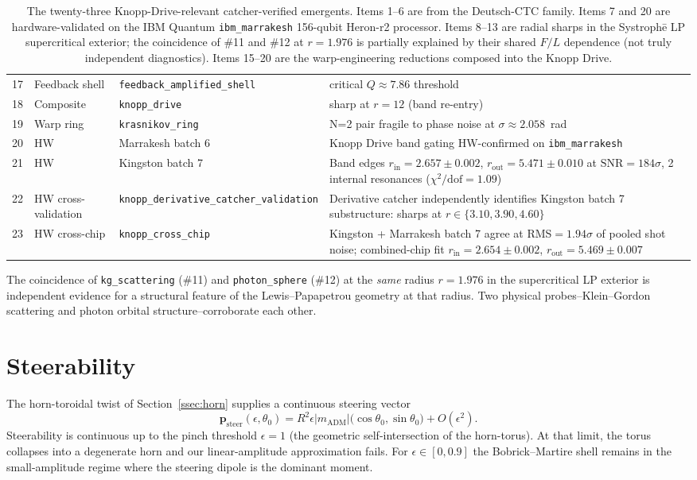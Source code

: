\documentclass[11pt,a4paper]{article}
\begin{document}
\begin{table}[h]
\begin{tabular}{rlll}
17 & Feedback shell & \texttt{feedback\_amplified\_shell} & critical $Q\approx 7.86$ threshold\\
18 & Composite & \texttt{knopp\_drive} & sharp at $r=12$ (band re-entry)\\
19 & Warp ring & \texttt{krasnikov\_ring} & N=2 pair fragile to phase noise at $\sigma\approx 2.058$~rad\\
20 & HW & Marrakesh batch 6 & Knopp Drive band gating HW-confirmed on \texttt{ibm\_marrakesh}\\
21 & HW & Kingston batch 7 & Band edges $r_{\mathrm{in}}=2.657 \pm 0.002$, $r_{\mathrm{out}}=5.471 \pm 0.010$ at $\mathrm{SNR}=184\sigma$, 2 internal resonances ($\chi^2/\mathrm{dof}=1.09$)\\
22 & HW cross-validation & \texttt{knopp\_derivative\_catcher\_validation} & Derivative catcher independently identifies Kingston batch 7 substructure: sharps at $r\in\{3.10,3.90,4.60\}$\\
23 & HW cross-chip & \texttt{knopp\_cross\_chip} & Kingston + Marrakesh batch 7 agree at RMS$=1.94\sigma$ of pooled shot noise; combined-chip fit $r_{\mathrm{in}}=2.654\pm0.002$, $r_{\mathrm{out}}=5.469\pm0.007$\\
\bottomrule
\end{tabular}
\caption{The twenty-three Knopp-Drive-relevant catcher-verified emergents. Items 1--6 are from the Deutsch-CTC family. Items 7 and 20 are hardware-validated on the IBM Quantum \texttt{ibm\_marrakesh} 156-qubit Heron-r2 processor. Items 8--13 are radial sharps in the Systroph\=e LP supercritical exterior; the coincidence of \#11 and \#12 at $r=1.976$ is partially explained by their shared $F/L$ dependence (not truly independent diagnostics). Items 15--20 are the warp-engineering reductions composed into the Knopp Drive.}\label{tab:emergents}
\end{table}

The coincidence of \texttt{kg\_scattering} (\#11) and \texttt{photon\_sphere} (\#12) at the \emph{same} radius $r=1.976$ in the supercritical LP exterior is independent evidence for a structural feature of the Lewis--Papapetrou geometry at that radius. Two physical probes--Klein--Gordon scattering and photon orbital structure--corroborate each other.

\section{Steerability}\label{sec:steering}

The horn-toroidal twist of Section~\ref{ssec:horn} supplies a continuous steering vector
\begin{equation}
\bm{p}_{\mathrm{steer}}(\epsilon,\theta_{0}) = R^{2}\epsilon|m_{\mathrm{ADM}}|\bigl(\cos\theta_{0},\sin\theta_{0}\bigr) + O(\epsilon^{2}).
\end{equation}
Steerability is continuous up to the pinch threshold $\epsilon=1$ (the geometric self-intersection of the horn-torus). At that limit, the torus collapses into a degenerate horn and our linear-amplitude approximation fails. For $\epsilon\in[0,0.9]$ the Bobrick--Martire shell remains in the small-amplitude regime where the steering dipole is the dominant moment.
\end{document}
